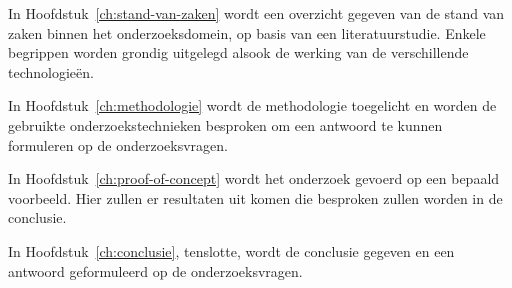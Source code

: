 In Hoofdstuk~\ref{ch:stand-van-zaken} wordt een overzicht gegeven van de stand van zaken binnen het onderzoeksdomein, op basis van een literatuurstudie. Enkele begrippen worden grondig uitgelegd alsook de werking van de verschillende technologieën.

In Hoofdstuk~\ref{ch:methodologie} wordt de methodologie toegelicht en worden de gebruikte onderzoekstechnieken besproken om een antwoord te kunnen formuleren op de onderzoeksvragen.

In Hoofdstuk~\ref{ch:proof-of-concept} wordt het onderzoek gevoerd op een bepaald voorbeeld. Hier zullen er resultaten uit komen die besproken zullen worden in de conclusie.

In Hoofdstuk~\ref{ch:conclusie}, tenslotte, wordt de conclusie gegeven en een antwoord geformuleerd op de onderzoeksvragen. 

